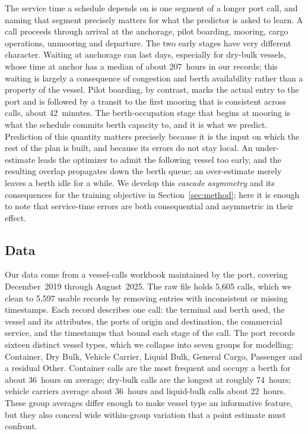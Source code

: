 The service time a schedule depends on is one segment of a longer port call, and
naming that segment precisely matters for what the predictor is asked to learn. A
call proceeds through arrival at the anchorage, pilot boarding, mooring, cargo
operations, unmooring and departure. The two early stages have very different
character. Waiting at anchorage can last days, especially for dry-bulk vessels,
whose time at anchor has a median of about 207~hours in our records; this waiting
is largely a consequence of congestion and berth availability rather than a
property of the vessel. Pilot boarding, by contrast, marks the actual entry to the
port and is followed by a transit to the first mooring that is
consistent across calls, about 42~minutes. The berth-occupation stage that begins at mooring is
what the schedule commits berth capacity to, and it is what we predict. Prediction
of this quantity matters precisely because it is the input on which the rest of the
plan is built, and because its errors do not stay local. An under-estimate leads
the optimizer to admit the following vessel too early, and the resulting overlap
propagates down the berth queue; an over-estimate merely leaves a berth idle for a
while. We develop this \emph{cascade asymmetry} and its consequences for the
training objective in Section~\ref{sec:method}; here it is enough to note that
service-time errors are both consequential and asymmetric in their effect.

\subsection{Data}\label{sec:data}

Our data come from a vessel-calls workbook maintained by the port, covering
December~2019 through August~2025. The raw file holds 5{,}605 calls, which we clean
to 5{,}597 usable records by removing entries with inconsistent or missing
timestamps. Each record describes one call: the terminal and berth used, the
vessel and its attributes, the ports of origin and destination, the commercial
service, and the timestamps that bound each stage of the call. The port records
sixteen distinct vessel types, which we collapse into seven groups for modelling:
Container, Dry Bulk, Vehicle Carrier, Liquid Bulk, General Cargo, Passenger and a
residual Other. Container calls are the most frequent and occupy a berth for about
36~hours on average; dry-bulk calls are the longest at roughly 74~hours; vehicle
carriers average about 36~hours and liquid-bulk calls about 22~hours. These group
averages differ enough to make vessel type an informative feature, but they also
conceal wide within-group variation that a point estimate must confront.

